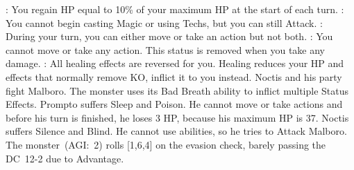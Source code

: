 %
: You regain HP equal to 10\% of your maximum HP at the start of each turn.\ofgap
%
: You cannot begin casting Magic or using Techs, but you can still Attack.\ofgap
%
: During your turn, you can either move or take an action but not both.\ofgap
%
: You cannot move or take any action. This status is removed when you take any damage.\ofgap
%
: All healing effects are reversed for you. Healing reduces your HP and effects that normally remove KO, inflict it to you instead.
%	
\vfill
%
{
	Noctis and his party fight Malboro. 
	The monster uses its Bad Breath ability to inflict multiple Status Effects.
	Prompto suffers Sleep and Poison. 
	He cannot move or take actions and before his turn is finished, he loses 3 HP, because his maximum HP is 37.
	Noctis suffers Silence and Blind.
	He cannot use abilities, so he tries to Attack Malboro. 
	The monster~(AGI:~2) rolls [1,6,4] on the evasion check, barely passing the \mbox{DC 12-2} due to Advantage.
}
%
\clearpage
